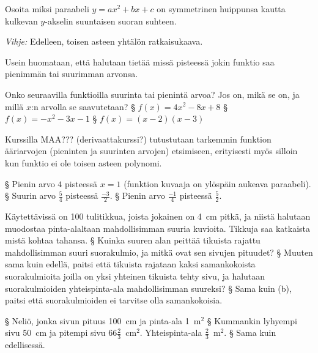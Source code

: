 \begin{tehtavasivu}
\begin{tehtava}
Osoita miksi paraabeli $y = ax^2 +bx +c$ on symmetrinen huippunsa kautta kulkevan $y$-akselin suuntaisen suoran suhteen.
\begin{vastaus}
    \emph{Vihje:} Edelleen, toisen asteen yhtälön ratkaisukaava.
\end{vastaus}
\end{tehtava}

\begin{tehtava}
Usein huomataan, että halutaan tietää missä pisteessä jokin funktio saa pienimmän tai suurimman arvonsa.

Onko seuraavilla funktioilla suurinta tai pienintä arvoa? Jos on, mikä se on, ja millä $x$:n arvolla se saavutetaan?
\alakohdat
    § $f(x) = 4x^2 - 8x + 8$
    § $f(x) = -x^2 - 3x - 1$
    § $f(x) = (x-2)(x-3)$
\loppu

Kurssilla MAA??? (derivaattakurssi?) tutustutaan tarkemmin funktion ääriarvojen (pieninten ja suurinten arvojen) etsimiseen, erityisesti myös silloin kun funktio ei ole toisen asteen polynomi.
	\begin{vastaus}
	\alakohdat
	    § Pienin arvo $4$ pisteessä $x = 1$ (funktion kuvaaja on ylöspäin aukeava paraabeli).
	    § Suurin arvo $\frac{5}{4}$ pisteessä $\frac{-3}{2}$.
	    § Pienin arvo $\frac{-1}{4}$ pisteessä $\frac{5}{2}$.
	\loppu
	\end{vastaus}
\end{tehtava}


\begin{tehtava}
Käytettävissä on 100 tulitikkua, joista jokainen on 4~cm pitkä, ja niistä halutaan muodostaa pinta-alaltaan mahdollisimman suuria kuvioita. Tikkuja saa katkaista mistä kohtaa tahansa.
\alakohdat
    § Kuinka suuren alan peittää tikuista rajattu mahdollisimman suuri suorakulmio, ja mitkä ovat sen sivujen pituudet?
    § Muuten sama kuin edellä, paitsi että tikuista rajataan kaksi samankokoista suorakulmioita joilla on yksi yhteinen tikuista tehty sivu, ja halutaan suorakulmioiden yhteispinta-ala mahdollisimman suureksi?
    § Sama kuin (b), paitsi että suorakulmioiden ei tarvitse olla samankokoisia.
\loppu
	\begin{vastaus}
	\alakohdat
        § Neliö, jonka sivun pituus 100~cm ja pinta-ala 1~m$^2$
        § Kummankin lyhyempi sivu 50~cm ja pitempi sivu $66\frac{2}{3}$~cm$^2$. Yhteispinta-ala $\frac{2}{3}$~m$^2$.
        § Sama kuin edellisessä.
    \loppu
	\end{vastaus}
\end{tehtava}


\end{tehtavasivu}
